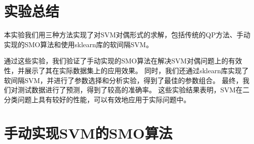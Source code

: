 \documentclass[12pt]{article}
\begin{document}
\section{实验总结}
本实验我们用三种方法实现了对SVM对偶形式的求解，包括传统的QP方法、手动实现的SMO算法和使用sklearn库的软间隔SVM。

通过这些实验，我们验证了手动实现的SMO算法在解决SVM对偶问题上的有效性，并展示了其在实际数据集上的应用效果。
同时，我们还通过sklearn库实现了软间隔SVM，并进行了参数选择和分析实验，得到了最佳的参数组合。
最终，我们对测试数据进行了预测，得到了较高的准确率。
这些实验结果表明，SVM在二分类问题上具有较好的性能，可以有效地应用于实际问题中。

\newpage
\appendix
\section{手动实现SVM的SMO算法}
\end{document}
